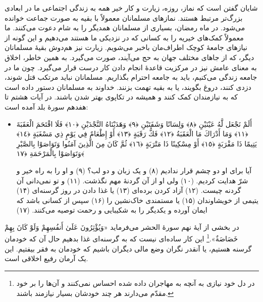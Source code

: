 شایان گفتن است که نماز، روزه، زیارت و کار خیر همه به زندگی اجتماعی ما در ابعادی بزرگ‌تر مرتبط هستند. نمازهای مسلمانان معمولاً با بقیه به صورت جماعت خوانده می‌شود. در ماه رمضان، بسیاری از مسلمانان همدیگر را به شام دعوت می‌کنند. ما معمولاً کمک‌های خیریه را به کسانی که در نزدیکی ما هستند می‌دهیم و این گونه از نیازهای جامعهٔ کوچک اطراف‌مان باخبر می‌شویم. زیارت نیز هم‌دوش بقیهٔ مسلمانان دیگر، که از جاهای مختلف جهان به حج می‌آیند، صورت می‌گیرد. به همین خاطر، اخلاق به معنای عامش نیز در مرکزیت قاعدهٔ انجام دادن کار درست قرار می‌گیرد. چون ما در جامعه زندگی می‌کنیم، باید به جامعه احترام بگذاریم. مسلمانان نباید مرتکب قتل شوند، دزدی کنند، دروغ بگویند، یا به بقیه تهمت بزنند. خداوند به مسلمانان دستور داده است که به نیازمندان کمک کنند و همیشه در تکاپوی بهتر شدن باشند. در آیات هشتم تا هفدهم سورهٔ بلد آمده است:

\begin{itemize}
	\item[]
	{
		أَلَمْ نَجْعَل لَّهُ عَيْنَيْنِ ﴿٨﴾ وَلِسَانًا وَشَفَتَيْنِ ﴿٩﴾ وَهَدَيْنَاهُ النَّجْدَيْنِ ﴿١٠﴾ فَلَا اقْتَحَمَ الْعَقَبَةَ ﴿١١﴾ وَمَا أَدْرَاكَ مَا الْعَقَبَةُ ﴿١٢﴾ فَكُّ رَقَبَةٍ ﴿١٣﴾ أَوْ إِطْعَامٌ فِي يَوْمٍ ذِي مَسْغَبَةٍ ﴿١٤﴾ يَتِيمًا ذَا مَقْرَبَةٍ ﴿١٥﴾ أَوْ مِسْكِينًا ذَا مَتْرَبَةٍ ﴿١٦﴾ ثُمَّ كَانَ مِنَ الَّذِينَ آمَنُوا وَتَوَاصَوْا بِالصَّبْرِ وَتَوَاصَوْا بِالْمَرْحَمَةِ ﴿١٧﴾}
	
	{
		آیا برای او دو چشم قرار ندادیم (۸) و یک زبان و دو لب؟ (۹) و او را به راه خیر و شرّ هدایت کردیم. (۱۰) ولی او از آن گردنهٔ مهم نگذشت. (۱۱) و تو نمی‌دانی آن گردنه چیست. (۱۲) آزاد کردن برده‌ای (۱۳) یا غذا دادن در روز گرسنه‌‌ای (۱۴) یتیمی از خویشاوندان (۱۵) یا مستمندی خاک‌نشین را (۱۶) سپس از کسانی باشد که ایمان آورده و یکدیگر را به شکیبایی و رحمت توصیه می‌کنند. (۱۷)
	}
\end{itemize}

در بخشی از آیهٔ نهم سورهٔ الحشر می‌فرماید { «وَيُؤْثِرُونَ عَلَىٰ أَنفُسِهِمْ وَلَوْ كَانَ بِهِمْ خَصَاصَةٌ».}\footnote{در دل خود نیازی به آنچه به مهاجران داده شده احساس نمی‌کنند و آن‌ها را بر خود مقدّم می‌دارند هر چند خودشان بسیار نیازمند باشند.} این کار ساده‌ای نیست که به گرسنه‌ای غذا بدهیم حال آن که خودمان گرسنه هستیم، یا آنقدر نگران وضع مالی دیگران باشیم که خودمان به فقر بیفتیم. این یک آرمان رفیع اخلاقی است.

